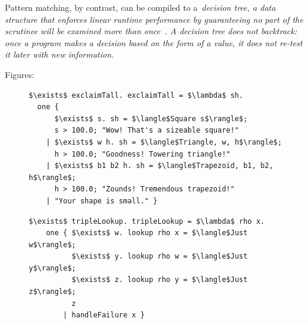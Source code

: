 \documentclass[manuscript,screen,12pt, nonacm]{acmart}
\begin{document}

    Pattern matching, by contrast, can be compiled to a~\it{decision tree}, a
    data structure that enforces linear runtime performance by guaranteeing no
    part of the scrutinee will be examined more than once~\citep{maranget}. A
    decision tree does not backtrack: once a program makes a decision based on
    the form of a value, it does not re-test it later with new information. 
    

    Figures: 

    \begin{figure}[ht] 
        \begin{minipage}[h]{0.54\linewidth}
          \verselst
          \begin{lstlisting}[numbers=none, basicstyle=\tiny, xleftmargin=.2em,
                            showstringspaces=false,
                            frame=single]
$\exists$ exclaimTall. exclaimTall = $\lambda$ sh. 
  one { 
      $\exists$ s. sh = $\langle$Square s$\rangle$; 
      s > 100.0; "Wow! That's a sizeable square!"
    | $\exists$ w h. sh = $\langle$Triangle, w, h$\rangle$; 
      h > 100.0; "Goodness! Towering triangle!"
    | $\exists$ b1 b2 h. sh = $\langle$Trapezoid, b1, b2, h$\rangle$;
      h > 100.0; "Zounds! Tremendous trapezoid!"
    | "Your shape is small." }
            \end{lstlisting}
            \label{fig:verseexclaimtall} 
        \end{minipage}%
        \begin{minipage}[h]{0.5\linewidth}
          \verselst
          \begin{lstlisting}[numbers=none, basicstyle=\tiny, xleftmargin=2em,
                        frame=single]
$\exists$ tripleLookup. tripleLookup = $\lambda$ rho x. 
    one { $\exists$ w. lookup rho x = $\langle$Just w$\rangle$; 
          $\exists$ y. lookup rho w = $\langle$Just y$\rangle$; 
          $\exists$ z. lookup rho y = $\langle$Just z$\rangle$;
          z
        | handleFailure x }
          \end{lstlisting}
            \label{fig:versetriplelookup} 
        \vspace{4ex}
        \end{minipage} 

\end{figure}
\end{document}
